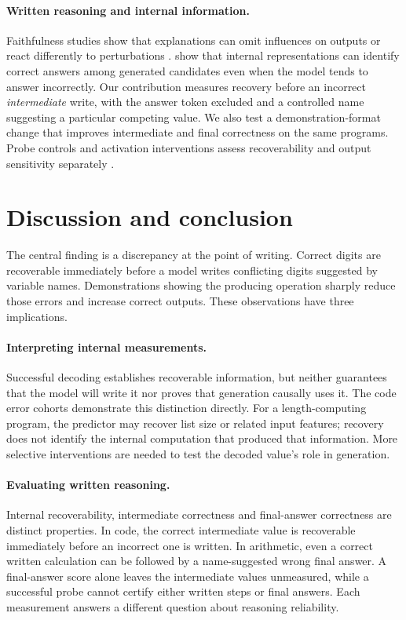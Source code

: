 \documentclass[11pt]{article}
\begin{document}
\paragraph{Written reasoning and internal information.} Faithfulness studies
show that explanations can omit influences on outputs or react differently to
perturbations \citep{turpin2023unfaithful,lanham2023measuring,chen2025reasoning}.
\citet{orgad2025know} show that internal representations can identify correct
answers among generated candidates even when the model tends to answer
incorrectly. Our contribution measures recovery before an incorrect
\emph{intermediate} write, with the answer token excluded and a controlled name
suggesting a particular competing value. We also test a demonstration-format
change that improves intermediate and final correctness on the same programs.
Probe controls and activation interventions assess recoverability and output
sensitivity separately \citep{hewitt2019control,zhang2024patching}.

\section{Discussion and conclusion}

The central finding is a discrepancy at the point of writing. Correct digits
are recoverable immediately before a model writes conflicting digits suggested
by variable names. Demonstrations showing the producing operation sharply
reduce those errors and increase correct outputs. These observations have three
implications.

\paragraph{Interpreting internal measurements.} Successful decoding establishes
recoverable information, but neither guarantees that the model will write it
nor proves that generation causally uses it. The code error cohorts demonstrate
this distinction directly. For a length-computing program, the predictor may
recover list size or related input features; recovery does not identify the
internal computation that produced that information. More selective
interventions are needed to test the decoded value's role in generation.

\paragraph{Evaluating written reasoning.} Internal recoverability, intermediate
correctness and final-answer correctness are distinct properties. In code, the
correct intermediate value is recoverable immediately before an incorrect one
is written. In arithmetic, even a correct written calculation can be followed
by a name-suggested wrong final answer. A final-answer score alone leaves the
intermediate values unmeasured, while a successful probe cannot certify either
written steps or final answers. Each measurement answers a different question
about reasoning reliability.
\end{document}
